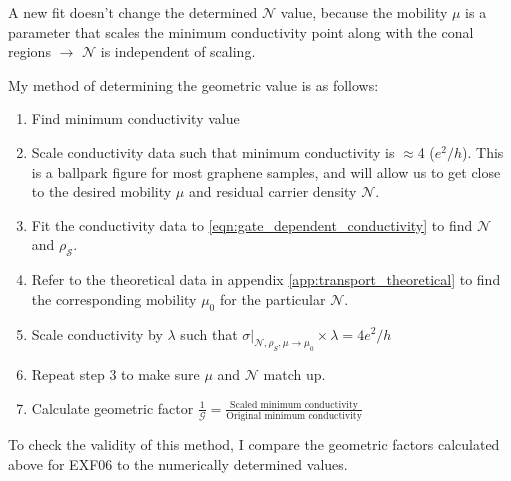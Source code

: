 \documentclass[../Matt_Gebert_Honours_Thesis.tex]{subfiles}
\begin{document}
A new fit doesn't change the determined $\mathcal{N}$ value, because the mobility $\mu$ is a parameter that scales the minimum conductivity point along with the conal regions $\to$ $\mathcal{N}$ is independent of scaling. 

My method of determining the geometric value is as follows:
\begin{enumerate}
	\itemsep0em
	\item Find minimum conductivity value
	\item Scale conductivity data such that minimum conductivity is $\approx$4 ($e^2/h$). This is a ballpark figure for most graphene samples\cite{tan_measurement_2007}, and will allow us to get close to the desired mobility $\mu$ and residual carrier density $\mathcal{N}$. 
	\item Fit the conductivity data to \cref{eqn:gate_dependent_conductivity} to find $\mathcal{N}$ and $\mathcal{\rho_S}$. 
	\label{enum:fit}
	\item Refer to the theoretical data in appendix \ref{app:transport_theoretical} to find the corresponding mobility $\mu_0$ for the particular $\mathcal{N}$.
	\item Scale conductivity by $\lambda$ such that $\left.\sigma\right|_{\mathcal{N},\rho_S,\mu\to\mu_0} \times \lambda = 4 e^2/h$
	\item Repeat step 3 to make sure $\mu$ and $\mathcal{N}$ match up.
	\item Calculate geometric factor $\frac{1}{\mathcal{G}} = \frac{\text{Scaled minimum conductivity}}{\text{Original minimum conductivity}}$
\end{enumerate}

To check the validity of this method, I compare the geometric factors calculated above for EXF06 to the numerically determined values.%

\end{document}
